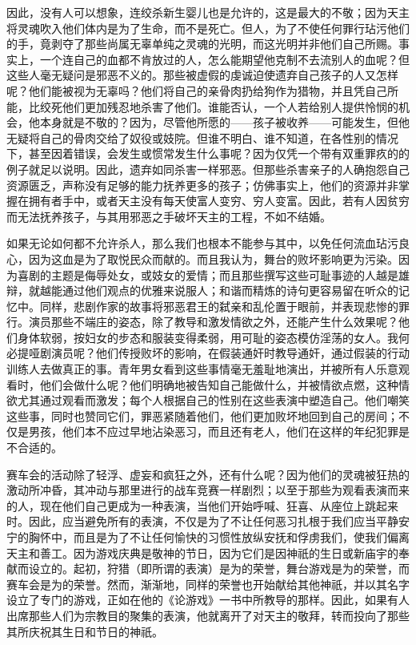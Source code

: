 因此，没有人可以想象，连绞杀新生婴儿也是允许的，这是最大的不敬；因为天主将灵魂吹入他们体内是为了生命，而不是死亡。但人，为了不使任何罪行玷污他们的手，竟剥夺了那些尚属无辜单纯之灵魂的光明，而这光明并非他们自己所赐。事实上，一个连自己的血都不肯放过的人，怎么能期望他克制不去流别人的血呢？但这些人毫无疑问是邪恶不义的。那些被虚假的虔诚迫使遗弃自己孩子的人又怎样呢？他们能被视为无辜吗？他们将自己的亲骨肉扔给狗作为猎物，并且凭自己所能，比绞死他们更加残忍地杀害了他们。谁能否认，一个人若给别人提供怜悯的机会，他本身就是不敬的？因为，尽管他所愿的——孩子被收养——可能发生，但他无疑将自己的骨肉交给了奴役或妓院。但谁不明白、谁不知道，在各性别的情况下，甚至因着错误，会发生或惯常发生什么事呢？因为仅凭一个带有双重罪疚的的例子就足以说明。因此，遗弃如同杀害一样邪恶。但那些杀害亲子的人确抱怨自己资源匮乏，声称没有足够的能力抚养更多的孩子；仿佛事实上，他们的资源并非掌握在拥有者手中，或者天主没有每天使富人变穷、穷人变富。因此，若有人因贫穷而无法抚养孩子，与其用邪恶之手破坏天主的工程，不如不结婚。\par

如果无论如何都不允许杀人，那么我们也根本不能参与其中，以免任何流血玷污良心，因为这血是为了取悦民众而献的。而且我认为，舞台的败坏影响更为污染。因为喜剧的主题是侮辱处女，或妓女的爱情；而且那些撰写这些可耻事迹的人越是雄辩，就越能通过他们观点的优雅来说服人；和谐而精炼的诗句更容易留在听众的记忆中。同样，悲剧作家的故事将邪恶君王的弑亲和乱伦置于眼前，并表现悲惨的罪行。演员那些不端庄的姿态，除了教导和激发情欲之外，还能产生什么效果呢？他们身体软弱，按妇女的步态和服装变得柔弱，用可耻的姿态模仿淫荡的女人。我何必提哑剧演员呢？他们传授败坏的影响，在假装通奸时教导通奸，通过假装的行动训练人去做真正的事。青年男女看到这些事情毫无羞耻地演出，并被所有人乐意观看时，他们会做什么呢？他们明确地被告知自己能做什么，并被情欲点燃，这种情欲尤其通过观看而激发；每个人根据自己的性别在这些表演中塑造自己。他们嘲笑这些事，同时也赞同它们，罪恶紧随着他们，他们更加败坏地回到自己的房间；不仅是男孩，他们本不应过早地沾染恶习，而且还有老人，他们在这样的年纪犯罪是不合适的。\par

赛车会的活动除了轻浮、虚妄和疯狂之外，还有什么呢？因为他们的灵魂被狂热的激动所冲昏，其冲动与那里进行的战车竞赛一样剧烈；以至于那些为观看表演而来的人，现在他们自己更成为一种表演，当他们开始呼喊、狂喜、从座位上跳起来时。因此，应当避免所有的表演，不仅是为了不让任何恶习扎根于我们应当平静安宁的胸怀中，而且是为了不让任何愉快的习惯性放纵安抚和俘虏我们，使我们偏离天主和善工。因为游戏庆典是敬神的节日，因为它们是因神祇的生日或新庙宇的奉献而设立的。起初，狩猎（即所谓的表演）是为的荣誉，舞台游戏是为的荣誉，而赛车会是为的荣誉。然而，渐渐地，同样的荣誉也开始献给其他神祇，并以其名字设立了专门的游戏，正如在他的《论游戏》一书中所教导的那样。因此，如果有人出席那些人们为宗教目的聚集的表演，他就离开了对天主的敬拜，转而投向了那些其所庆祝其生日和节日的神祇。\par

